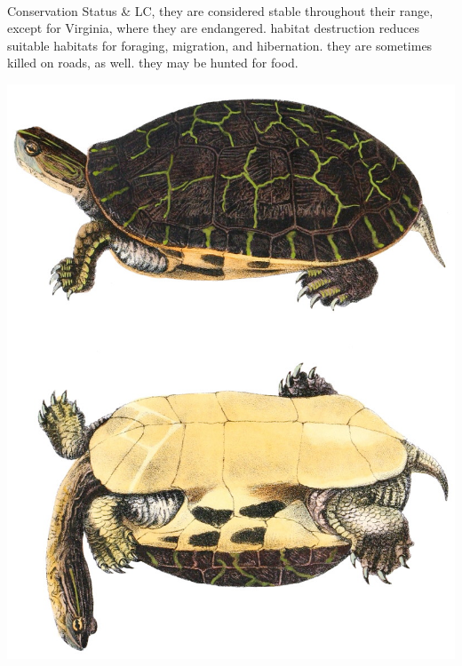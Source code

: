 \begin{center}
\begin{longtabu}
	\\
	\hline
	Conservation Status & 
	LC, they are considered stable throughout their range, except for Virginia, where they are endangered. habitat destruction reduces suitable habitats for foraging, migration, and hibernation. they are sometimes killed on roads, as well. they may be hunted for food.
	\\
	\hline
\end{longtabu}
\includegraphics[scale=0.25]{testudines/emydidae/deirochelys/1}
\end{center}
